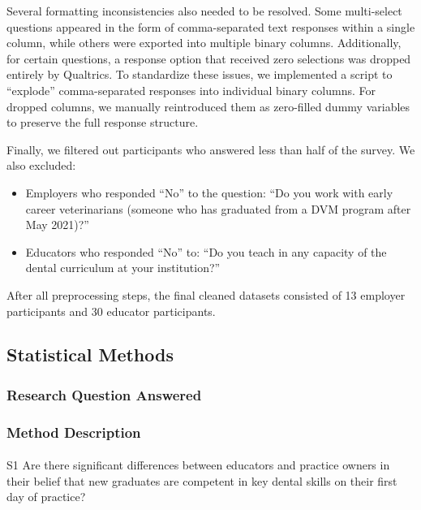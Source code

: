 \documentclass[
  11pt,
  letterpaper,
  DIV=11,
  numbers=noendperiod]{scrartcl}
\makeatletter
\let\oldparagraph\paragraph
\renewcommand{\paragraph}{
    \@ifstar
      \xxxParagraphStar
      \xxxParagraphNoStar
  }
\newcommand{\xxxParagraphStar}[1]{\oldparagraph*{#1}\mbox{}}
\newcommand{\xxxParagraphNoStar}[1]{\oldparagraph{#1}\mbox{}}
\makeatother
\begin{document}
Several formatting inconsistencies also needed to be resolved. Some
multi-select questions appeared in the form of comma-separated text
responses within a single column, while others were exported into
multiple binary columns. Additionally, for certain questions, a response
option that received zero selections was dropped entirely by Qualtrics.
To standardize these issues, we implemented a script to ``explode''
comma-separated responses into individual binary columns. For dropped
columns, we manually reintroduced them as zero-filled dummy variables to
preserve the full response structure.

Finally, we filtered out participants who answered less than half of the
survey. We also excluded:

\begin{itemize}
\item
  Employers who responded ``No'' to the question: ``Do you work with
  early career veterinarians (someone who has graduated from a DVM
  program after May 2021)?''
\item
  Educators who responded ``No'' to: ``Do you teach in any capacity of
  the dental curriculum at your institution?''
\end{itemize}

After all preprocessing steps, the final cleaned datasets consisted of
13 employer participants and 30 educator participants.

\subsection{Statistical Methods}\label{statistical-methods}

\subsubsection{Research Question
Answered}\label{research-question-answered}

\subsubsection{Method Description}\label{method-description}

\paragraph{S1 Are there significant differences between educators and
practice owners in their belief that new graduates are competent in key
dental skills on their first day of
practice?}\label{s1-are-there-significant-differences-between-educators-and-practice-owners-in-their-belief-that-new-graduates-are-competent-in-key-dental-skills-on-their-first-day-of-practice}
\end{document}

